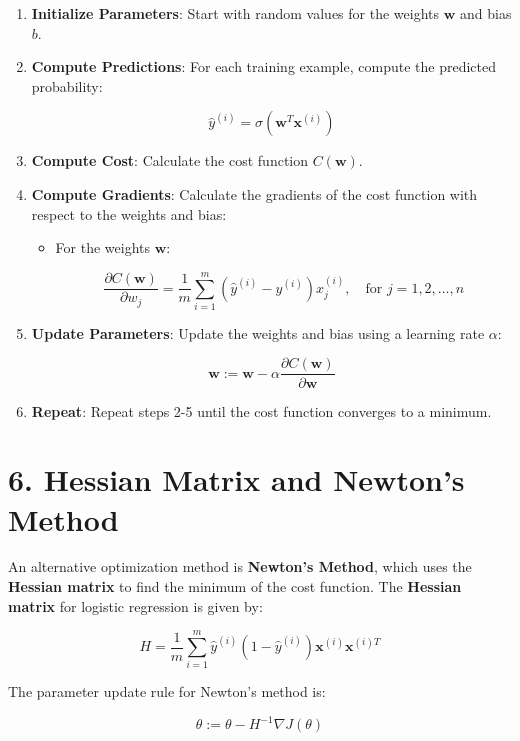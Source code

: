 \documentclass[
]{article}
\begin{document}
\begin{enumerate}
\def\labelenumi{\arabic{enumi}.}
\item
  \textbf{Initialize Parameters}: Start with random values for the
  weights \(\mathbf{w}\) and bias \(b\).
\item
  \textbf{Compute Predictions}: For each training example, compute the
  predicted probability:

  \[
  \hat{y}^{(i)} = \sigma(\mathbf{w}^T \mathbf{x}^{(i)})
  \]
\item
  \textbf{Compute Cost}: Calculate the cost function \(C(\mathbf{w})\).
\item
  \textbf{Compute Gradients}: Calculate the gradients of the cost
  function with respect to the weights and bias:

  \begin{itemize}
  \item
    For the weights \(\mathbf{w}\):

    \[
    \frac{\partial C(\mathbf{w})}{\partial w_j} = \frac{1}{m} \sum_{i=1}^m \left( \hat{y}^{(i)} - y^{(i)} \right) x_j^{(i)}, \quad \text{for } j = 1, 2, \dots, n
    \]
  \end{itemize}
\item
  \textbf{Update Parameters}: Update the weights and bias using a
  learning rate \(\alpha\):

  \[
  \mathbf{w} := \mathbf{w} - \alpha \frac{\partial C(\mathbf{w})}{\partial \mathbf{w}}
  \]
\item
  \textbf{Repeat}: Repeat steps 2-5 until the cost function converges to
  a minimum.
\end{enumerate}

\section{6. Hessian Matrix and Newton's
Method}\label{hessian-matrix-and-newtons-method}

An alternative optimization method is \textbf{Newton's Method}, which
uses the \textbf{Hessian matrix} to find the minimum of the cost
function. The \textbf{Hessian matrix} for logistic regression is given
by:

\[
H = \frac{1}{m} \sum_{i=1}^m \hat{y}^{(i)} (1 - \hat{y}^{(i)}) \mathbf{x}^{(i)} \mathbf{x}^{(i)T}
\]

The parameter update rule for Newton's method is:

\[
\theta := \theta - H^{-1} \nabla J(\theta)
\]
\end{document}
